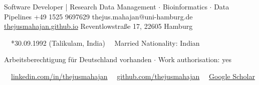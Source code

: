 \documentclass{thejus_cv}
\begin{document}
         {Software Developer | Research Data Management $\cdot$ Bioinformatics $\cdot$ Data Pipelines}
         {+49 1525 9697629}
         {thejus.mahajan@uni-hamburg.de}
         {\href{https://thejusmahajan.github.io}{thejusmahajan.github.io}}
         {Reventlowstra{\ss}e 17, 22605 Hamburg}

\vspace{-1.45cm}
{\small\color{white}
\faCalendar\ \ *30.09.1992 (Talikulam, India) \hspace{0.5cm} \faUser\ \ Married \hspace{0.5cm} Nationality: Indian
}\par
\vspace{0.1cm}
{\small\color{white}
Arbeitsberechtigung f\"ur Deutschland vorhanden $\cdot$ Work authorisation: yes
}\par
\vspace{0.1cm}
{\small\color{white}
\faLinkedin\ \ \href{https://www.linkedin.com/in/thejusmahajan/}{linkedin.com/in/thejusmahajan}
\hspace{0.5cm}
\faGithub\ \ \href{https://github.com/thejusmahajan}{github.com/thejusmahajan}
\hspace{0.5cm}
\faGraduationCap\ \ \href{https://scholar.google.com/citations?user=PJkZwAwAAAAJ}{Google Scholar}
}\par
\vspace{0.1cm}
\end{document}
